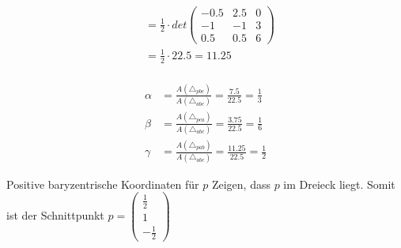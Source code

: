 \documentclass{article}
\begin{document}
\[\begin{aligned}
                           & = \frac{1}{2} \cdot det \begin{pmatrix}
                                                         -0.5 & 2.5 & 0 \\
                                                         -1   & -1   & 3 \\
                                                         0.5 & 0.5 & 6
                                                     \end{pmatrix}           \\
                           & = \frac{1}{2} \cdot 22.5 = 11.25                \\
    \end{aligned}
\]

\[
    \begin{aligned}
        \alpha &= \frac{A(\triangle_{pbc})}{A(\triangle_{abc})} = \frac{7.5}{22.5} = \frac{1}{3}\\
        \beta  &= \frac{A(\triangle_{pca})}{A(\triangle_{abc})} = \frac{3.75}{22.5} = \frac{1}{6}\\
        \gamma &= \frac{A(\triangle_{pab})}{A(\triangle_{abc})} = \frac{11.25}{22.5} = \frac{1}{2}
    \end{aligned}
\]

Positive baryzentrische Koordinaten für $p$ Zeigen, dass $p$ im Dreieck liegt. 
Somit ist der Schnittpunkt $p=\begin{pmatrix} \frac{1}{2} \\ 1 \\ -\frac{1}{2} \end{pmatrix}$
\end{document}
